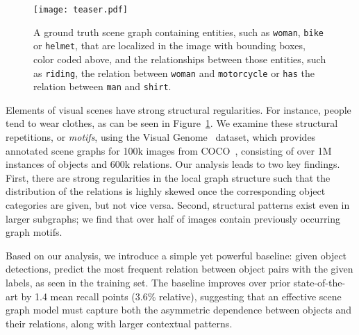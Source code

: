 \documentclass[10pt,twocolumn,letterpaper]{article}
\newcommand{\yc}[1]{{\color{purple}yc:[#1]}}
\newcommand{\my}[1]{{\color{orange}my:[#1]}}
\begin{document}
\begin{figure}
    \centering
    \texttt{[image: teaser.pdf]}
    \caption{A ground truth scene graph containing entities, such as \texttt{woman}, \texttt{bike} or \texttt{helmet}, that are localized in the image with bounding boxes, color coded above, and the relationships between those entities, such as \texttt{riding}, the relation between \texttt{woman} and \texttt{motorcycle} or \texttt{has} the relation between \texttt{man} and \texttt{shirt}.
    }
    \label{fig:teaser}
\end{figure}%
Elements of visual scenes have strong structural regularities.
For instance, people tend to wear clothes, as can be seen in Figure~\ref{fig:teaser}.
We examine these structural repetitions, or \emph{motifs}, using the Visual Genome~\cite{visualgenome} dataset, which provides annotated scene graphs for 100k images from COCO~\cite{mscoco}, consisting of over 1M instances of objects and 600k relations.
Our analysis leads to two key findings.
First, there are strong regularities in the local graph structure such that
the distribution of the relations is highly skewed once the corresponding object categories are given, but not vice versa.
Second, structural patterns exist even in larger
subgraphs; we find that over half of images contain previously occurring graph motifs. %

Based on our analysis, we introduce a simple yet powerful baseline: given object detections, predict the most frequent relation between object pairs with the given labels, as seen in the training set.
The baseline improves over prior state-of-the-art by 1.4 mean recall points (3.6\% relative), suggesting that an effective scene graph model must capture both the asymmetric dependence between objects and their relations, along with larger contextual patterns.
\end{document}

